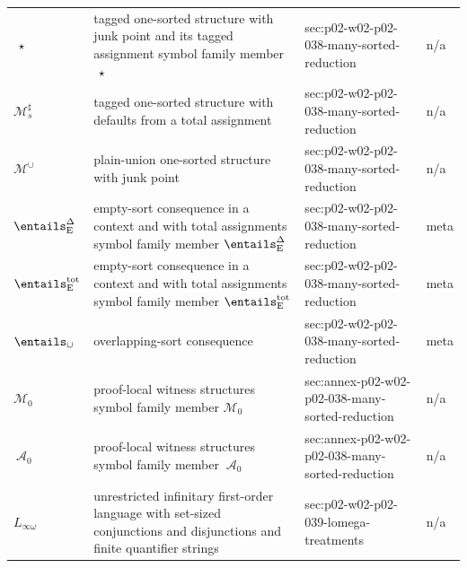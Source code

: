 \begin{longtable}{@{}p{}p{}p{}p{}@{}}
\(\ \star\) & tagged one-sorted structure with junk point and its tagged assignment symbol family member \(\ \star\) & sec:\allowbreak{}p02-\allowbreak{}w02-\allowbreak{}p02-\allowbreak{}038-\allowbreak{}many-\allowbreak{}sorted-\allowbreak{}reduction & n/a \\
\(\mathcal M^{\sharp}_{s}\) & tagged one-sorted structure with defaults from a total assignment & sec:\allowbreak{}p02-\allowbreak{}w02-\allowbreak{}p02-\allowbreak{}038-\allowbreak{}many-\allowbreak{}sorted-\allowbreak{}reduction & n/a \\
\(\mathcal M^{\cup}\) & plain-union one-sorted structure with junk point & sec:\allowbreak{}p02-\allowbreak{}w02-\allowbreak{}p02-\allowbreak{}038-\allowbreak{}many-\allowbreak{}sorted-\allowbreak{}reduction & n/a \\
\(\entails^{\Delta}_{\mathrm E}\) & empty-sort consequence in a context and with total assignments symbol family member \(\entails^{\Delta}_{\mathrm E}\) & sec:\allowbreak{}p02-\allowbreak{}w02-\allowbreak{}p02-\allowbreak{}038-\allowbreak{}many-\allowbreak{}sorted-\allowbreak{}reduction & meta \\
\(\entails^{\mathrm{tot}}_{\mathrm E}\) & empty-sort consequence in a context and with total assignments symbol family member \(\entails^{\mathrm{tot}}_{\mathrm E}\) & sec:\allowbreak{}p02-\allowbreak{}w02-\allowbreak{}p02-\allowbreak{}038-\allowbreak{}many-\allowbreak{}sorted-\allowbreak{}reduction & meta \\
\(\entails_{\cup}\) & overlapping-sort consequence & sec:\allowbreak{}p02-\allowbreak{}w02-\allowbreak{}p02-\allowbreak{}038-\allowbreak{}many-\allowbreak{}sorted-\allowbreak{}reduction & meta \\
\(\mathcal M_0\) & proof-local witness structures symbol family member \(\mathcal M_0\) & sec:\allowbreak{}annex-\allowbreak{}p02-\allowbreak{}w02-\allowbreak{}p02-\allowbreak{}038-\allowbreak{}many-\allowbreak{}sorted-\allowbreak{}reduction & n/a \\
\(\ \mathcal A_0\) & proof-local witness structures symbol family member \(\ \mathcal A_0\) & sec:\allowbreak{}annex-\allowbreak{}p02-\allowbreak{}w02-\allowbreak{}p02-\allowbreak{}038-\allowbreak{}many-\allowbreak{}sorted-\allowbreak{}reduction & n/a \\
\(L_{\infty\omega}\) & unrestricted infinitary first-order language with set-sized conjunctions and disjunctions and finite quantifier strings & sec:\allowbreak{}p02-\allowbreak{}w02-\allowbreak{}p02-\allowbreak{}039-\allowbreak{}lomega-\allowbreak{}treatments & n/a \\

\end{longtable}
